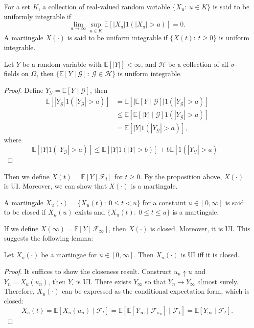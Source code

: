 \begin{definition}
For a set $K$, a collection of real-valued random variable $\{X_u:~u\in K\}$ is said to be uniformly integrable if
\[
\lim_{a\to\infty}\sup_{u\in K}\mathbb{E}[|X_u|1(|X_u|>a)]=0.
\]
A martingale $X(\cdot)$ is said to be uniform integrable if $\{X(t):~t\ge0\}$ is uniform integrable.
\end{definition}

\begin{proposition}
Let $Y$ be a random variable with $\mathbb{E}[|Y|]<\infty$, and $\mathcal{H}$ be a collection of all $\sigma$-fields on $\Omega$, then $\{\mathbb{E}[Y\mid\mathcal{G}]:~\mathcal{G}\in\mathcal{H}\}$ is uniform integrable.
\end{proposition}
\begin{proof}
Define $Y_{\mathcal{G}}= \mathbb{E}[Y\mid\mathcal{G}]$, then
\begin{align*}
\mathbb{E}[|Y_{\mathcal{G}}|1(|Y_{\mathcal{G}}|>a)]
&=
\mathbb{E}[|\mathbb{E}[Y\mid\mathcal{G}]|1(|Y_{\mathcal{G}}|>a)]\\
&\le 
\mathbb{E}[\mathbb{E}[|Y|\mid\mathcal{G}]1(|Y_{\mathcal{G}}|>a)]\\
&=\mathbb{E}[|Y|1(|Y_{\mathcal{G}}|>a)],
\end{align*}
where 
\[
\mathbb{E}[|Y|1(|Y_{\mathcal{G}}|>a)]\le 
\mathbb{E}[|Y|1(|Y|>b)] + b\mathbb{E}[1(|Y_{\mathcal{G}}|>a)]
\]

\end{proof}

Then we define $X(t)=\mathbb{E}[Y\mid\mathcal{F}_t]$ for $t\ge0$.
By the proposition above, $X(\cdot)$ is UI. Moreover, we can show that $X(\cdot)$ is a martingale.

\begin{definition}
A martingale $X_{u}(\cdot)=\{X_u(t):~0\le t<u\}$ for a constaint $u\in[0,\infty]$ is said to be closed if $X_u(u)$ exists and $\{X_u(t):~0\le t\le u\}$ is a martingale.
\end{definition}

If we define $X(\infty)=\mathbb{E}[Y\mid\mathcal{F}_\infty]$, then $X(\cdot)$ is closed.
Moreover, it is UI. This suggests the following lemma: 
\begin{proposition}\label{pro:11:4}
Let $X_u(\cdot)$ be a martingae for $u\in[0,\infty]$.
Then $X_u(\cdot)$ is UI iff it is closed.
\end{proposition}
\begin{proof}
It suffices to show the closeness result.
Construct $u_n\uparrow u$ and $Y_n=X_u(u_n)$, then $Y_{\cdot}$ is UI.
There exists $Y_{\infty}$ so that $Y_n\to Y_\infty$ almost surely.
Therefore, $X_u(\cdot)$ can be expressed as the conditional expectation form, which is closed:
\[
X_u(t)=\mathbb{E}[X_u(u_n)\mid\mathcal{F}_t]
=\mathbb{E}[\mathbb{E}[Y_\infty\mid\mathcal{F}_{u_n}]\mid\mathcal{F}_t]=\mathbb{E}[Y_\infty\mid\mathcal{F}_t].
\]
\end{proof}

